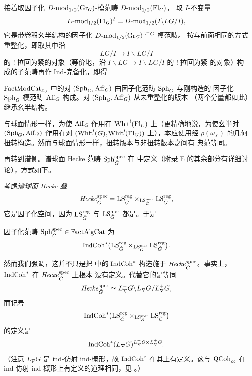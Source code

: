 接着取因子化 $D\text{-}\mathrm{mod}_{1/2}(\mathrm{Gr}_G)$-模范畴 $D\text{-}\mathrm{mod}_{1/2}(\mathrm{Fl}_G)$，
取 $I$-不变量
\[
D\text{-}\mathrm{mod}_{1/2}(\mathrm{Fl}_G)^I=D\text{-}\mathrm{mod}_{1/2}(I\backslash LG/I),
\]
它是带卷积幺半结构的因子化 $D\text{-}\mathrm{mod}_{1/2}(\mathrm{Gr}_G)^{L^+G}$-模范畴。
按与前面相同的方式重整化，即取其中沿
\[
LG/I\to I\backslash LG/I
\]
的 $!$-拉回为紧的对象（等价地，沿 $I\backslash LG\to I\backslash LG/I$ 的 $!$-拉回为紧
的对象）构成的子范畴再作 Ind-完备化，即得

\begin{definition}
\label{def:aff}
$\mathrm{FactModCat}_{x_0}$ 中的对 $(\mathrm{Sph}_G,\mathrm{Aff}_G)$ 由因子化范畴 $\mathrm{Sph}_G$ 与刚构造的
因子化 $\mathrm{Sph}_G$-模范畴 $\mathrm{Aff}_G$ 构成。对 $(\mathrm{Sph}_G,\mathrm{Aff}_G)$ 从未重整化的版本
（两个分量都如此）继承幺半结构。
\end{definition}

\begin{remark}
\label{rem:aff-twist}
与球面情形一样，为使 $\mathrm{Aff}_G$ 作用在 $\mathrm{Whit}^{!}(\mathrm{Fl}_G)$ 上（更精确地说，为使幺半对
$(\mathrm{Sph}_G,\mathrm{Aff}_G)$ 作用在对 $(\mathrm{Whit}^{!}(G),\mathrm{Whit}^{!}(\mathrm{Fl}_G))$ 上），本应使用经
$\rho(\omega_X)$ 的几何扭转构造。然而与球面情形一样，扭转版本与非扭转版本之间有
典范等同。
\end{remark}

再转到谱侧。谱球面 Hecke 范畴 $\mathrm{Sph}^{\mathrm{spec}}_{\check G}$ 在 \cite[附录 E.2]{ABC+24a}
中定义（附录 E 的其余部分有详细讨论），方式如下。

考虑\emph{谱球面 Hecke 叠}
\[
\mathit{Hecke}^{\mathrm{spec}}_{\check G}
=\mathrm{LS}^{\mathrm{reg}}_{\check G}\times_{\mathrm{LS}^{\mathrm{mer}}_{\check G}}\mathrm{LS}^{\mathrm{reg}}_{\check G},
\]
它是因子化空间，因为 $\mathrm{LS}^{\mathrm{reg}}_{\check G}$ 与 $\mathrm{LS}^{\mathrm{mer}}_{\check G}$ 都是。于是

\begin{definition}
\label{def:sph-spec}
因子化范畴 $\mathrm{Sph}^{\mathrm{spec}}_{\check G}\in \mathrm{FactAlgCat}$ 为
\[
\mathrm{IndCoh}^{*}\bigl(\mathrm{LS}^{\mathrm{reg}}_{\check G}
\times_{\mathrm{LS}^{\mathrm{mer}}_{\check G}}\mathrm{LS}^{\mathrm{reg}}_{\check G}\bigr).
\]
\end{definition}

然而我们强调，这并不只是把 \cite[附录 A.5]{ABC+24a} 中的 $\mathrm{IndCoh}^{*}$ 构造施于
$\mathit{Hecke}^{\mathrm{spec}}_{\check G}$。事实上，$\mathrm{IndCoh}^{*}$ 在 $\mathit{Hecke}^{\mathrm{spec}}_{\check G}$ 上根本
没有定义。代替它的是等同
\[
\mathit{Hecke}^{\mathrm{spec}}_{\check G}\simeq L^+_\nabla G\backslash L_\nabla G/L^+_\nabla G,
\]
而记号
\[
\mathrm{IndCoh}^{*}\bigl(\mathrm{LS}^{\mathrm{reg}}_{\check G}\times_{\mathrm{LS}^{\mathrm{mer}}_{\check G}}
\mathrm{LS}^{\mathrm{reg}}_{\check G}\bigr)
\]
的定义是
\[
\mathrm{IndCoh}^{*}(L_\nabla G)^{L^+_\nabla G\times L^+_\nabla G}.
\]
（注意 $L_\nabla G$ 是 ind-仿射 ind-概形，故 $\mathrm{IndCoh}^{*}$ 在其上有定义。这与
$\mathrm{QCoh}_{co}$ 在 ind-仿射 ind-概形上有定义的道理相同，见 \cite[附录 A.2]{ABC+24a}。）

